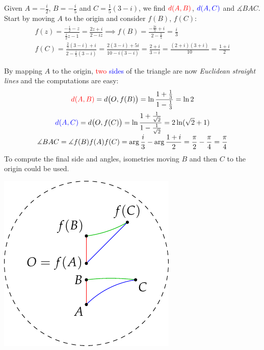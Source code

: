 \begin{example}{}{}
	Given $A=-\frac i2$, $B=-\frac i5$ and $C=\frac 1{5}(3-i)$, we find $\textcolor{red}{d(A,B)}$, $\textcolor{blue}{d(A,C)}$ and $\measuredangle BAC$.\smallbreak
	Start by moving $A$ to the origin and consider $f(B)$, $f(C)$:
	\begin{gather*}
		f(z)=\frac{-\frac i2-z}{\frac i2z-1} =\frac{2z+i}{2-iz} \implies 
		f(B)=\frac{-\frac{2i}5+i}{2-\frac 15} =\frac i3\\
		f(C)=\frac{\frac 25(3-i)+i}{2-\frac i5(3-i)} =\frac{2(3-i)+5i}{10-i(3-i)} =\frac{2+i}{3-i}= \frac{(2+i)(3+i)}{10} =\frac{1+i}2
	\end{gather*}
	\begin{minipage}[t]{0.67\linewidth}\vspace{0pt}
		By mapping $A$ to the origin, \textcolor{red}{two} \textcolor{blue}{sides} of the triangle are now \emph{Euclidean straight lines} and the computations are easy:
		\begin{gather*}
	  	\textcolor{red}{d(A,B)} =d\bigl(O,f(B)\bigr) =\ln\frac{1+\frac 13}{1-\frac 13} =\ln 2\\
	  	\textcolor{blue}{d(A,C)} =d\bigl(O,f(C)\bigr) =\ln\frac{1+\frac 1{\sqrt 2}}{1-\frac 1{\sqrt 2}} =2\ln (\sqrt 2+1)\\[-3pt]
	  	\measuredangle BAC =\measuredangle f(B)f(A)f(C) =\arg\frac i3-\arg\frac{1+i}2 =\frac\pi 2-\frac\pi 4 =\frac\pi 4
		\end{gather*}
		To compute the final side and angles, isometries moving $B$ and then $C$ to the origin could be used.
	\end{minipage}
	\hfill
	\begin{minipage}[t]{0.32\linewidth}\vspace{-2pt}
		\flushright\includegraphics[scale=0.95]{calc-triangle}
	\end{minipage}
\end{example}



